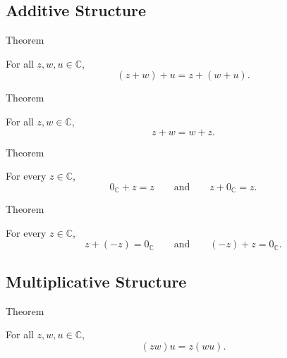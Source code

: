 \subsection*{Additive Structure}

\begin{theorembox}{Theorem}
\begin{theorem}
\label{thm:addition-on-c-associative}
For all \(z,w,u\in\mathbb{C}\),
\[
(z+w)+u=z+(w+u).
\]
\end{theorem}
\end{theorembox}

\begin{theorembox}{Theorem}
\begin{theorem}
\label{thm:addition-on-c-commutative}
For all \(z,w\in\mathbb{C}\),
\[
z+w=w+z.
\]
\end{theorem}
\end{theorembox}

\begin{theorembox}{Theorem}
\begin{theorem}
\label{thm:zero-additive-identity-on-c}
For every \(z\in\mathbb{C}\),
\[
0_{\mathbb{C}}+z=z
\qquad\text{and}\qquad
z+0_{\mathbb{C}}=z.
\]
\end{theorem}
\end{theorembox}

\begin{theorembox}{Theorem}
\begin{theorem}
\label{thm:every-complex-has-additive-inverse}
For every \(z\in\mathbb{C}\),
\[
z+(-z)=0_{\mathbb{C}}
\qquad\text{and}\qquad
(-z)+z=0_{\mathbb{C}}.
\]
\end{theorem}
\end{theorembox}

\subsection*{Multiplicative Structure}

\begin{theorembox}{Theorem}
\begin{theorem}
\label{thm:multiplication-on-c-associative}
For all \(z,w,u\in\mathbb{C}\),
\[
(zw)u=z(wu).
\]
\end{theorem}
\end{theorembox}

